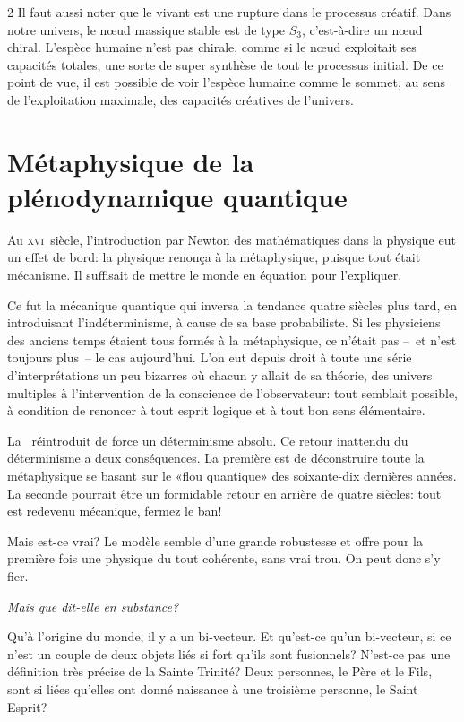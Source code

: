 \begin{multicols}{2}
Il faut aussi noter que le vivant est une rupture dans le processus
créatif. Dans notre univers, le nœud massique stable est de type $S_3$,
c'est-à-dire un nœud chiral. L'espèce humaine n'est pas chirale, comme
si le nœud exploitait ses capacités totales, une sorte de super
synthèse de tout le processus initial. De ce point de vue, il est
possible de voir l'espèce humaine comme le sommet, au sens de l'exploitation maximale, des capacités
créatives de l'univers.

\section{Métaphysique de la plénodynamique quantique}

Au \textsc{xvi}\ieme\ siècle, l'introduction par Newton des mathématiques dans la physique eut un effet de bord: la physique renonça à la métaphysique, puisque tout était mécanisme. Il suffisait de mettre le monde en équation pour l'expliquer.

Ce fut la mécanique quantique qui inversa la tendance quatre siècles plus tard, en introduisant
l'indéterminisme, à cause de sa base probabiliste. Si les
physiciens des anciens temps étaient tous formés à la métaphysique, ce
n'était pas --~et n'est toujours plus~-- le cas aujourd'hui. L'on eut depuis droit à
toute une série d'interprétations un peu bizarres où chacun y allait de
sa théorie, des univers multiples à l'intervention de la conscience de
l'observateur: tout semblait possible, à condition de renoncer à tout
esprit logique et à tout bon sens élémentaire.

La \PQ\ réintroduit de force un déterminisme absolu. Ce retour inattendu
du déterminisme a deux conséquences. La première est de déconstruire
toute la métaphysique se basant sur le «flou quantique» des
soixante-dix dernières années. La seconde pourrait être un formidable
retour en arrière de quatre siècles: tout est redevenu mécanique, fermez le
ban!

Mais est-ce vrai? Le modèle semble d'une grande robustesse et offre
pour la première fois une physique du tout cohérente, sans vrai trou.
On peut donc s'y fier.

\textit{Mais que dit-elle en substance?}

Qu'à l'origine du monde, il y a un bi-vecteur. Et qu'est-ce qu'un
bi-vecteur, si ce n'est un couple de deux objets liés si fort qu'ils sont
fusionnels? N'est-ce pas une définition très précise de la Sainte
Trinité? Deux personnes, le Père et le Fils, sont si liées qu'elles ont
donné naissance à une troisième personne, le Saint Esprit? \cite{aleteia_trinite_ref}


\end{multicols}
